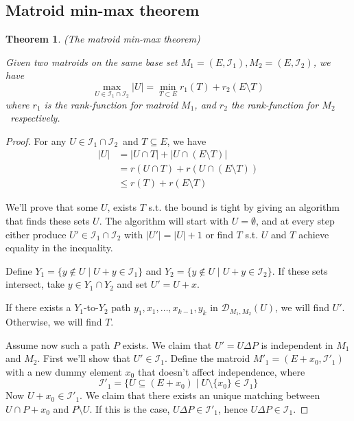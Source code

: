 \documentclass{article}
\newtheorem{theorem}{Theorem}[section]
\begin{document}
\subsection{Matroid min-max theorem}
\begin{theorem}
(The matroid min-max theorem)

Given two matroids on the same base set $M_{1} = (E, \mathcal{I}_{1}), M_{2} = (E, \mathcal{I}_{2})$, we have
\begin{equation*}
\max_{U \in \mathcal{I}_{1} \cap \mathcal{I}_{2}} |U| = \min_{T \subset E} r_{1}(T) + r_{2}(E \setminus T)
\end{equation*}
where $r_{1}$ is the rank-function for matroid $M_{1}$, and $r_{2}$ the rank-function for $M_{2}$ respectively.
\end{theorem}
\begin{proof}
For any $U \in \mathcal{I}_{1} \cap \mathcal{I}_{2}$ and $T \subseteq E$, we have
\begin{align*}
|U|	&= |U \cap T| + |U \cap (E \setminus T)|\\
	&= r(U \cap T) + r(U \cap (E \setminus T))\\
	&\leq r(T) + r(E \setminus T)
\end{align*}

We'll prove that some $U$, exists $T$ s.t. the bound is tight by giving an algorithm that finds these sets $U$.
The algorithm will start with $U = \emptyset$, and at every step either produce $U' \in \mathcal{I}_{1} \cap \mathcal{I}_{2}$
with $|U'| = |U| + 1$ or find $T$ s.t. $U$ and $T$ achieve equality in the inequality.

Define $Y_{1} = \{y \not\in U \mid U + y \in \mathcal{I}_{1}\}$ and $Y_{2} = \{y \not\in U \mid U + y \in \mathcal{I}_{2}\}$.
If these sets intersect, take $y \in Y_{1} \cap Y_{2}$ and set $U' = U + x$.

If there exists a $Y_{1}$-to-$Y_{2}$ path $y_{1}, x_{1}, \dots, x_{k-1}, y_{k}$ in $\mathcal{D}_{M_{1}, M_{2}}(U)$,
we will find $U'$. Otherwise, we will find $T$.

Assume now such a path $P$ exists. We claim that $U' = U \Delta P$ is independent in $M_{1}$ and $M_{2}$.
First we'll show that $U' \in \mathcal{I}_{1}$. Define the matroid $M'_{1} = (E + x_{0}, \mathcal{I}'_{1})$
with a new dummy element $x_{0}$ that doesn't affect independence, where
\begin{equation*}
\mathcal{I}'_{1} = \{U \subseteq (E + x_{0}) \mid U \setminus \{x_{0}\} \in \mathcal{I}_{1}\}
\end{equation*}
Now $U + x_{0} \in \mathcal{I}'_{1}$. We claim that there exists an unique matching between $U \cap P + x_{0}$ and $P \setminus U$.
If this is the case, $U \Delta P \in \mathcal{I}'_{1}$, hence $U \Delta P \in \mathcal{I}_{1}$.


\end{proof}
\end{document}
